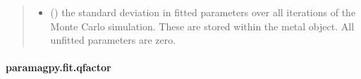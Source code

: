 \documentclass[a4paper,10pt,english,openany,oneside]{sphinxmanual}
\begin{document}
\begin{fulllineitems}
\begin{quote}
\begin{description}
\begin{itemize}
\item {} 
 () \textendash{} the standard deviation in fitted parameters over all iterations of the
Monte Carlo simulation.
These are stored within the metal object. All unfitted parameters
are zero.

\end{itemize}


\end{description}\end{quote}

\end{fulllineitems}



\paragraph{paramagpy.fit.qfactor}
\label{\detokenize{reference/generated/paramagpy.fit.qfactor:paramagpy-fit-qfactor}}\label{\detokenize{reference/generated/paramagpy.fit.qfactor::doc}}
\end{document}
